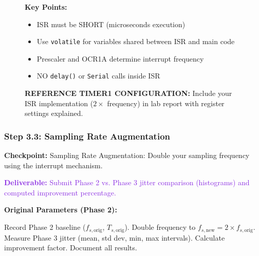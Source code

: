 \documentclass[11pt,letterpaper]{article}
\providecommand{\cpECE}[1]{\textcolor{OliveGreen}{\textbf{Checkpoint:} #1}}
\providecommand{\delECE}[1]{\textcolor{BlueViolet}{\textbf{Deliverable:} #1}}
\begin{document}
\begin{figure}[H]
    \vspace{0.3in}
    \textbf{Key Points:}
    \begin{itemize}
        \item ISR must be SHORT (microseconds execution)
        \item Use \texttt{volatile} for variables shared between ISR and main code
        \item Prescaler and OCR1A determine interrupt frequency
        \item NO \texttt{delay()} or \texttt{Serial} calls inside ISR
    \end{itemize}
    
    \vspace{0.3in}
    \caption{\textbf{REFERENCE TIMER1 CONFIGURATION:} Include your ISR implementation ($2\times$ frequency) in lab report with register settings explained.}
    \label{fig:isr_code}
\end{figure}

\subsubsection{Step 3.3: Sampling Rate Augmentation}
\cpECE{Sampling Rate Augmentation:} Double your sampling frequency using the interrupt mechanism.

\delECE{Submit Phase 2 vs. Phase 3 jitter comparison (histograms) and computed improvement percentage.}

\textbf{Original Parameters (Phase 2):}


Record Phase 2 baseline ($f_{s,\text{orig}}$, $T_{s,\text{orig}}$). Double frequency to $f_{s,\text{new}} = 2 \times f_{s,\text{orig}}$. Measure Phase 3 jitter (mean, std dev, min, max intervals). Calculate improvement factor. Document all results.
\end{document}
